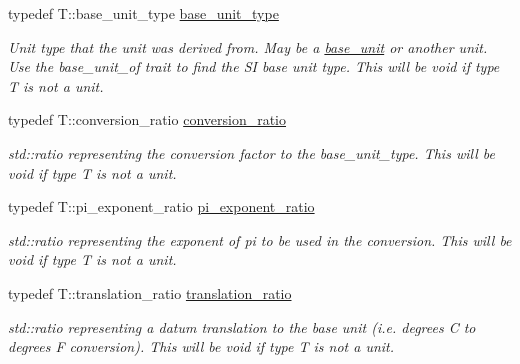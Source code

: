 \begin{DoxyCompactItemize}
\item 
\hypertarget{structunits_1_1traits_1_1unit__traits_a383a749c168d74ee16e79ec892dd2dfa}{}typedef T\+::base\+\_\+unit\+\_\+type \hyperlink{structunits_1_1traits_1_1unit__traits_a383a749c168d74ee16e79ec892dd2dfa}{base\+\_\+unit\+\_\+type}\label{structunits_1_1traits_1_1unit__traits_a383a749c168d74ee16e79ec892dd2dfa}

\begin{DoxyCompactList}\small\item\em Unit type that the unit was derived from. May be a {\ttfamily \hyperlink{structunits_1_1base__unit}{base\+\_\+unit}} or another {\ttfamily unit}. Use the {\ttfamily base\+\_\+unit\+\_\+of} trait to find the S\+I base unit type. This will be {\ttfamily void} if type {\ttfamily T} is not a unit. \end{DoxyCompactList}\item 
\hypertarget{structunits_1_1traits_1_1unit__traits_a502c916633cee73f5a5e7c6c1e654675}{}typedef T\+::conversion\+\_\+ratio \hyperlink{structunits_1_1traits_1_1unit__traits_a502c916633cee73f5a5e7c6c1e654675}{conversion\+\_\+ratio}\label{structunits_1_1traits_1_1unit__traits_a502c916633cee73f5a5e7c6c1e654675}

\begin{DoxyCompactList}\small\item\em {\ttfamily std\+::ratio} representing the conversion factor to the {\ttfamily base\+\_\+unit\+\_\+type}. This will be {\ttfamily void} if type {\ttfamily T} is not a unit. \end{DoxyCompactList}\item 
\hypertarget{structunits_1_1traits_1_1unit__traits_acf2430e728313804d63bdd1c55936967}{}typedef T\+::pi\+\_\+exponent\+\_\+ratio \hyperlink{structunits_1_1traits_1_1unit__traits_acf2430e728313804d63bdd1c55936967}{pi\+\_\+exponent\+\_\+ratio}\label{structunits_1_1traits_1_1unit__traits_acf2430e728313804d63bdd1c55936967}

\begin{DoxyCompactList}\small\item\em {\ttfamily std\+::ratio} representing the exponent of pi to be used in the conversion. This will be {\ttfamily void} if type {\ttfamily T} is not a unit. \end{DoxyCompactList}\item 
\hypertarget{structunits_1_1traits_1_1unit__traits_ab9872efa06cb637a5d6146822f7beb98}{}typedef T\+::translation\+\_\+ratio \hyperlink{structunits_1_1traits_1_1unit__traits_ab9872efa06cb637a5d6146822f7beb98}{translation\+\_\+ratio}\label{structunits_1_1traits_1_1unit__traits_ab9872efa06cb637a5d6146822f7beb98}

\begin{DoxyCompactList}\small\item\em {\ttfamily std\+::ratio} representing a datum translation to the base unit (i.\+e. degrees C to degrees F conversion). This will be {\ttfamily void} if type {\ttfamily T} is not a unit. \end{DoxyCompactList}\end{DoxyCompactItemize}


